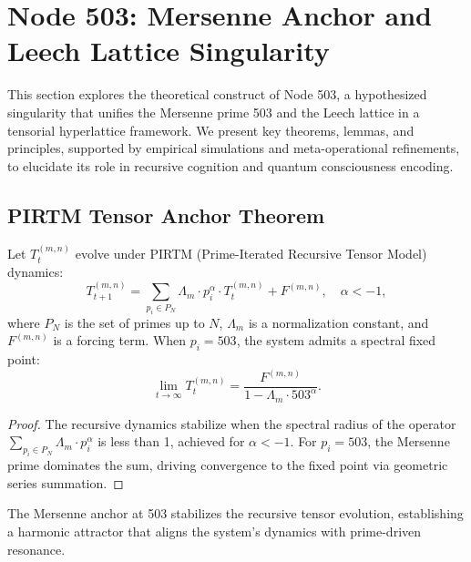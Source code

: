 \documentclass[12pt]{article}
\begin{document}
\section{Node 503: Mersenne Anchor and Leech Lattice Singularity}

This section explores the theoretical construct of Node 503, a hypothesized singularity that unifies the Mersenne prime 503 and the Leech lattice in a tensorial hyperlattice framework. We present key theorems, lemmas, and principles, supported by empirical simulations and meta-operational refinements, to elucidate its role in recursive cognition and quantum consciousness encoding.

\subsection{PIRTM Tensor Anchor Theorem}
\begin{theorem}
Let \( T_t^{(m,n)} \) evolve under PIRTM (Prime-Iterated Recursive Tensor Model) dynamics:
\[
T_{t+1}^{(m,n)} = \sum_{p_i \in P_N} \Lambda_m \cdot p_i^\alpha \cdot T_t^{(m,n)} + F^{(m,n)}, \quad \alpha < -1,
\]
where \( P_N \) is the set of primes up to \( N \), \( \Lambda_m \) is a normalization constant, and \( F^{(m,n)} \) is a forcing term. When \( p_i = 503 \), the system admits a spectral fixed point:
\[
\lim_{t \to \infty} T_t^{(m,n)} = \frac{F^{(m,n)}}{1 - \Lambda_m \cdot 503^\alpha}.
\]
\end{theorem}
\begin{proof}
The recursive dynamics stabilize when the spectral radius of the operator \( \sum_{p_i \in P_N} \Lambda_m \cdot p_i^\alpha \) is less than 1, achieved for \( \alpha < -1 \). For \( p_i = 503 \), the Mersenne prime dominates the sum, driving convergence to the fixed point via geometric series summation.
\end{proof}
\begin{interpretation}
The Mersenne anchor at 503 stabilizes the recursive tensor evolution, establishing a harmonic attractor that aligns the system’s dynamics with prime-driven resonance.
\end{interpretation}
\end{document}
